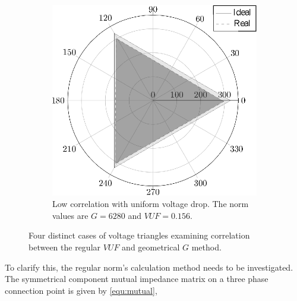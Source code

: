 \begin{figure}
\begin{subfigure}[b]{0.48\textwidth}
                    \includegraphics[width=\textwidth]{Unblance_EPS_Pics/EPS_images/circle.eps}
                    \caption{\centering Low correlation with uniform voltage drop. The norm values are $G=6280$ and $VUF=0.156$.}
                    \label{fig:cases_D}
                \end{subfigure}


                \caption{Four distinct cases of voltage triangles examining correlation between the regular $VUF$ and geometrical $G$ method.}\label{fig:cases}
            \end{figure}

To clarify this, the regular norm's calculation method needs to be investigated. The symmetrical component mutual impedance matrix on a three phase connection point is given by \ref{equ:mutual},

